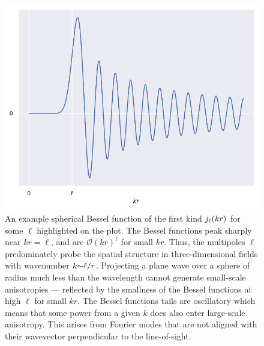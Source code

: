 \begin{figure}[htpb]
	\centering\capstart{}
	\includegraphics[width=\textwidth]{spherical_bessel.pdf}
	\caption[
		An example spherical Bessel function of the first kind
	]{
		An example spherical Bessel function of the first kind \(j_{\ell}(k r)\) for some \(\ell{}\) highlighted on the plot.
		The Bessel functions peak sharply near \(k r = \ell{}\), and are \(\mathcal{O}{(k r)}^{\ell}\) for small \(k r\).
		Thus, the multipoles \(\ell{}\) predominately probe the spatial structure in three-dimensional fields with wavenumber \(k {\thicksim}\ell/r\).
		Projecting a plane wave over a sphere of radius much less than the wavelength cannot generate small-scale anisotropies --- reflected by the smallness of the Bessel functions at high \(\ell{}\) for small \(k r\).
		The Bessel functions tails are oscillatory which means that some power from a given \(k\) does also enter large-scale anisotropy.
		This arises from Fourier modes that are not aligned with their wavevector perpendicular to the line-of-sight.
	}\label{fig:chapter2_spherical_bessel}
\end{figure}
